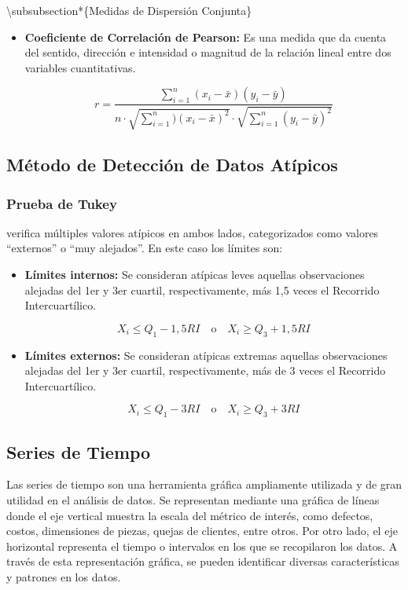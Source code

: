 \documentclass[oneside,11pt]{Latex/Classes/PhDthesisPSnPDF}
\begin{document}
\textbackslash subsubsection*\{Medidas de Dispersión Conjunta\}

\begin{itemize}
\item{\textbf{Coeficiente de Correlación de Pearson:} Es una medida que da cuenta del sentido, dirección e intensidad o magnitud de la relación lineal entre dos variables cuantitativas.}

$$r = \frac{\sum_{i=1}^{n} (x_i - \bar{x})(y_i - \bar{y})}{n\cdot\sqrt{\sum_{i=1}^{n}) (x_i - \bar{x})^2} \cdot \sqrt{\sum_{i=1}^{n} (y_i - \bar{y})^2}}$$
\end{itemize}

\hfill\break

\subsection{Método de Detección de Datos Atípicos}
\subsubsection*{Prueba de Tukey}

verifica múltiples valores atípicos en ambos lados, categorizados como
valores ``externos'' o ``muy alejados''. En este caso los límites son:

\begin{itemize}
\item{\textbf{Límites internos:} Se consideran atípicas leves aquellas observaciones alejadas del 1er y 3er cuartil, respectivamente, más 1,5 veces el Recorrido Intercuartílico.}

$$X_i \le Q_1 - 1,5RI \quad \text{o} \quad X_i \ge Q_3 + 1,5RI$$

\item{\textbf{Límites externos:} Se consideran atípicas extremas aquellas observaciones alejadas del 1er y 3er cuartil, respectivamente, más de 3 veces el Recorrido Intercuartílico.}

$$X_i \le Q_1 - 3RI \quad \text{o} \quad X_i \ge Q_3 + 3RI$$
\end{itemize}

\hfill\break

\subsection{Series de Tiempo}

Las series de tiempo son una herramienta gráfica ampliamente utilizada y
de gran utilidad en el análisis de datos. Se representan mediante una
gráfica de líneas donde el eje vertical muestra la escala del métrico de
interés, como defectos, costos, dimensiones de piezas, quejas de
clientes, entre otros. Por otro lado, el eje horizontal representa el
tiempo o intervalos en los que se recopilaron los datos. A través de
esta representación gráfica, se pueden identificar diversas
características y patrones en los datos.
\end{document}
